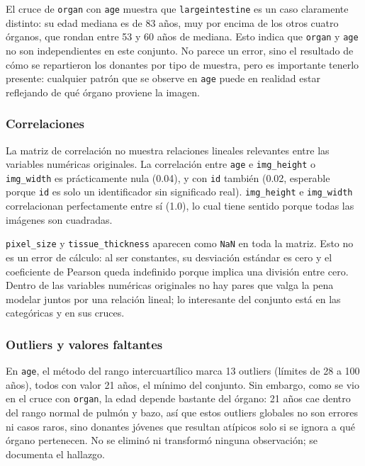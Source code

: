 \documentclass[11pt,letterpaper]{article}
\begin{document}
El cruce de \texttt{organ} con \texttt{age} muestra que \texttt{largeintestine} es un caso claramente
distinto: su edad mediana es de 83 años, muy por encima de los otros cuatro órganos, que rondan entre
53 y 60 años de mediana. Esto indica que \texttt{organ} y \texttt{age} no son independientes en este
conjunto. No parece un error, sino el resultado de cómo se repartieron los donantes por tipo de
muestra, pero es importante tenerlo presente: cualquier patrón que se observe en \texttt{age} puede
en realidad estar reflejando de qué órgano proviene la imagen.

\subsubsection{Correlaciones}

La matriz de correlación no muestra relaciones lineales relevantes entre las variables numéricas
originales. La correlación entre \texttt{age} e \texttt{img\_height} o \texttt{img\_width} es
prácticamente nula (0.04), y con \texttt{id} también (0.02, esperable porque \texttt{id} es solo un
identificador sin significado real). \texttt{img\_height} e \texttt{img\_width} correlacionan
perfectamente entre sí (1.0), lo cual tiene sentido porque todas las imágenes son cuadradas.

\texttt{pixel\_size} y \texttt{tissue\_thickness} aparecen como \texttt{NaN} en toda la matriz. Esto
no es un error de cálculo: al ser constantes, su desviación estándar es cero y el coeficiente de
Pearson queda indefinido porque implica una división entre cero. Dentro de las variables numéricas
originales no hay pares que valga la pena modelar juntos por una relación lineal; lo interesante del
conjunto está en las categóricas y en sus cruces.

\subsubsection{Outliers y valores faltantes}

En \texttt{age}, el método del rango intercuartílico marca 13 outliers (límites de 28 a 100 años),
todos con valor 21 años, el mínimo del conjunto. Sin embargo, como se vio en el cruce con
\texttt{organ}, la edad depende bastante del órgano: 21 años cae dentro del rango normal de pulmón y
bazo, así que estos outliers globales no son errores ni casos raros, sino donantes jóvenes que
resultan atípicos solo si se ignora a qué órgano pertenecen. No se eliminó ni transformó ninguna
observación; se documenta el hallazgo.
\end{document}
